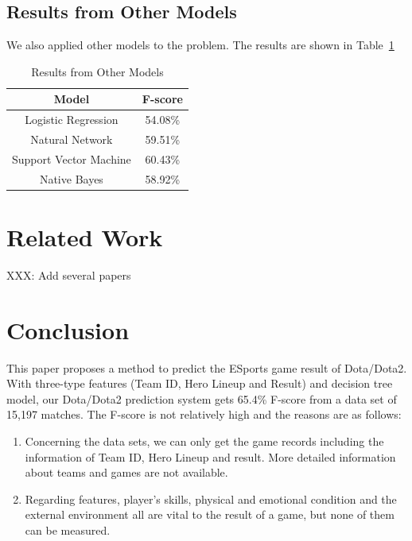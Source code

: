 \documentclass{article}
\begin{document}
\subsection{Results from Other Models}
We also applied other models to the problem. The results are shown in Table~\ref{table:others}

\begin{table}
\begin{center}
\begin{tabular}{|c|c|}
\hline
Model & F-score \\ \hline
Logistic Regression & 54.08\% \\ \hline
Natural Network & 59.51\% \\ \hline
Support Vector Machine & 60.43\% \\ \hline
Native Bayes & 58.92\% \\ \hline
\end{tabular}
\caption{Results from Other Models}
\label{table:others}
\end{center}
\end{table}

\section{Related Work}
XXX: Add several papers

\section{Conclusion}

This paper proposes a method to predict the ESports game result of Dota/Dota2. With three-type features (Team ID, Hero Lineup and Result) and decision tree model, our Dota/Dota2 prediction system gets 65.4\% F-score from a data set of 15,197 matches. 
The F-score is not relatively high and the reasons are as follows:
\begin{enumerate}
\item Concerning the data sets, we can only get the game records including the information of Team ID, Hero Lineup and result. More detailed information about teams and games are not available.
\item Regarding features, player’s skills, physical and emotional condition and the external environment all are vital to the result of a game, but none of them can be measured.
\end{enumerate}

\vfill\pagebreak



\end{document}
